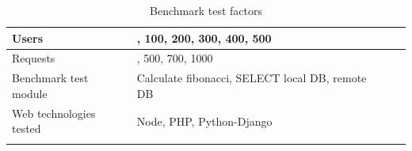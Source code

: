 \documentclass[../thesis.tex]{subfiles}
\begin{document}
\begin{table}[H]
	\caption{Benchmark test factors}
	\centering
	\footnotesize
	\label{tab1}
	\begin{tabular}{!{\color{sapphire}\vrule width 1pt}m{0.22\textwidth}!{\color{black}\vrule width 1pt}m{0.22\textwidth}!{\color{black}\vrule width 1pt}m{0.22\textwidth}!{\color{black}\vrule width 1pt}m{0.22\textwidth}!{\color{sapphire}\vrule width 1pt}}
		\hline
		\Centering Users &
		, 100, 200, 300, 400, 500 \\
		\hline
		\Centering Requests &
		, 500, 700, 1000 \\
		\hline
		\Centering Benchmark test module & 
		\Centering Calculate fibonacci, SELECT local DB, remote DB \\
		\hline
		\Centering Web technologies tested & 
		\Centering Node, PHP, Python-Django \\
		\hline
		\hline
	\end{tabular}
\end{table} 
\lipsum[1-1]
\end{document}
